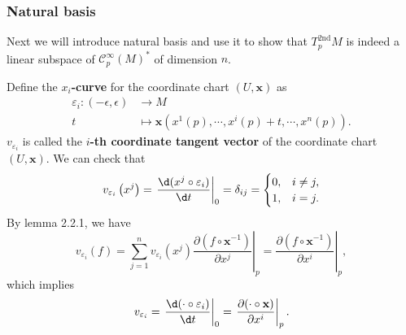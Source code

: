 \documentclass{report}
\begin{document}
\subsubsection{Natural basis}
Next we will introduce natural basis and use it to show that $T^{2\mathrm{nd}}_pM$ is indeed a linear subspace of $\mathcal{C}^{\infty}_p(M)^*$ of dimension $n$.



\noindent Define the \textbf{$x_i$-curve} for the coordinate chart $(U,\mathbf{x})$ as
\[
    \begin{aligned}
        \varepsilon_i:(-\epsilon,\epsilon)&\longrightarrow M\\
        t&\longmapsto\mathbf{x}\left(x^1(p),\cdots,{x}^i(p)+t,\cdots,x^n(p)\right).
    \end{aligned}
\]
$v_{\varepsilon_i}$ is called the \textbf{$i$-th coordinate tangent vector} of the coordinate chart $(U,\mathbf{x})$.
We can check that
\[
    v_{\varepsilon_i}\left( x^j\right)=\left.\frac{\d( x^j\circ\varepsilon_i)}{\d t}\right|_0=\delta_{ij}=\begin{cases}
        0,& i\ne j,\\
        1,& i=j.
        \end{cases}
\]
By lemma 2.2.1, we have
\[
    v_{\varepsilon_i}(f)=\sum_{j=1}^n v_{\varepsilon_i}( x^j) \left.\frac{\partial (f\circ \mathbf{x}^{-1})}{\partial x^j}\right|_{p}=\left.\frac{\partial (f\circ \mathbf{x}^{-1})}{\partial x^i}\right|_{p},
\]
which implies 
\[
    v_{\varepsilon_i}=\left.\frac{\d(\cdot \circ\varepsilon_i)}{\d t}\right|_0=\left.\frac{\partial (\cdot \circ \mathbf{x})}{\partial x^i}\right|_{p}.
\]
\end{document}
